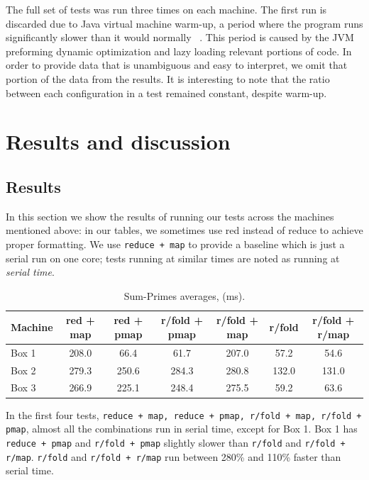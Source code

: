 \documentclass[12pt]{article}
\newcommand{\comment}[1]{{\bf \tt  {#1}}}
\newcommand{\emcomment}[1]{\textcolor{ForestGreen}{\comment{Elena: {#1}}}}
\newcommand{\clocode}[1]{{\texttt {#1}}}
\begin{document}
The full set of tests was run three times on each machine. The first run is discarded due to Java virtual machine warm-up, a period where the program runs significantly slower than it would normally~\cite{Blackburn:2008} . This period is caused by the JVM preforming dynamic optimization and lazy loading relevant portions of code. In order to provide data that is unambiguous and easy to interpret, we omit that portion of the data from the results. It is interesting to note that the ratio between each configuration in a test remained constant, despite warm-up.


\section{Results and discussion}\label{sec:results-disc}
\subsection{Results}\label{sec:results}
In this section we show the results of running our tests across the machines mentioned above: in our tables, we sometimes use red instead of reduce to achieve proper formatting. We use \clocode{reduce + map} to provide a baseline which is just a serial run on one core; tests running at similar times are noted as running at {\it serial time}.

\begin{table}[h!]
\begin{center}
\begin{tabular}{|l|c|c|c|c|c|c|}
\hline
Machine & red + map & red + pmap & r/fold + pmap & r/fold + map & r/fold & r/fold + r/map \\
\hline
Box 1 & 208.0 & 66.4 & 61.7 & 207.0 & 57.2 &  54.6 \\
Box 2 & 279.3 & 250.6 & 284.3 & 280.8 & 132.0 & 131.0 \\
Box 3 & 266.9 & 225.1 & 248.4 & 275.5 & 59.2 & 63.6 \\
\hline
\end{tabular}
\end{center}
\caption{Sum-Primes averages, (ms).}\label{table:sum-primes}
\end{table}

 In the first four tests, \clocode{reduce + map, reduce + pmap, r/fold + map, r/fold + pmap}, almost all the combinations run in serial time, except for Box 1. Box 1 has \clocode{reduce + pmap} and \clocode{r/fold + pmap} slightly slower than \clocode{r/fold} and \clocode{r/fold + r/map}. \clocode{r/fold} and \clocode{r/fold + r/map} run between 280\% and 110\% faster than serial time.
\end{document}
